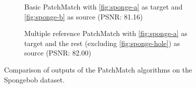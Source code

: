 \begin{figure}
\centering
\hfill
\begin{subfigure}{0.4\linewidth}
\caption{Basic PatchMatch with \ref{fig:sponge-a} as target and \ref{fig:sponge-b} as source (PSNR: 81.16)}
\label{fig:spongebasic}
\end{subfigure}
\hfill
\begin{subfigure}{0.4\linewidth}
\caption{Multiple reference PatchMatch with \ref{fig:sponge-a} as target and the rest (excluding \ref{fig:sponge-hole}) as source (PSNR: 82.00)}
\label{fig:spongerefs}
\end{subfigure}
\caption{Comparison of outputs of the PatchMatch algorithms on the Spongebob dataset.}
\label{fig:spongecompare}
\end{figure}

